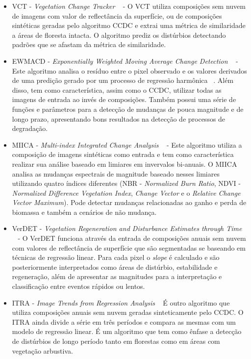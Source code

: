 \documentclass[twocolumn]{article}
\begin{document}
\begin{itemize}
  \item VCT - \textit{Vegetation Change Tracker} ~\cite{Huang2010, THOMAS201119} - O VCT utiliza composições sem nuvem de imagens com valor de reflectância da superfície, ou de composições sintéticas geradas pelo algoritmo CCDC e extrai uma métrica de similaridade a áreas de floresta intacta. O algoritmo prediz os distúrbios detectando padrões que se afastam da métrica de similaridade. 
  
  \item EWMACD - \textit{Exponentially Weighted Moving Average Change Detection} ~\cite{Brooks2014} - Este algoritmo analisa o resíduo entre o pixel observado e os valores derivados de uma predição gerado por um processo de regressão harmônica ~\cite{Brooks2012}. Além disso, tem como característica, assim como o CCDC, utilizar todas as imagens de entrada ao invés de composições. Também possui uma série de funções e parâmetros para a detecção de mudanças de pouca magnitude e de longo prazo, apresentando bons resultados na detecção de processos de degradação.
  
  \item MIICA - \textit{Multi-index Integrated Change Analysis} ~\cite{JIN2013159} - Este algoritmo utiliza a composição de imagens sintéticas como entrada e tem como característica realizar sua análise baseado em limiares em invervalos bi-anuais. O MIICA analisa as mudanças espectrais de magnitude baseado nesses limiares utilizando quatro índices diferentes (NBR - \textit{Normalized Burn Ratio}, NDVI - \textit{Normalized Difference Vegetation Index}, \textit{Change Vector} e o \textit{Relative Change Vector Maximum}). Pode detectar mudanças relacionadas ao ganho e perda de biomassa e também a cenários de não mudança.
  
  \item VerDET - \textit{Vegetation Regeneration and Disturbance Estimates through Time} ~\cite{Hughes2017} - O VerDET funciona através da entrada de composições anuais sem nuvem com valores de reflectância de superfície que são segmentadas se baseando em técnicas de regressão linear. Para cada pixel o \textit{slope} é calculado e são posteriormente interpretados como áreas de distúrbio, estabilidade e regeneração, além de apresentar as magnitudes para a interpretação e classificação entre eventos rápidos ou lentos.
  
  
  \item ITRA - \textit{Image Trends from Regression Analysis} ~\cite{VOGELMANN201292} É outro algoritmo que utiliza composições anuais sem nuvem geradas sinteticamente pelo CCDC. O ITRA ainda divide a série em três períodos e compara as mesmas com um modelo de regressão linear. É um algoritmo que tem como ênfase a detecção de distúrbios de longo período tanto em florestas como em áreas com vegetação arbustiva.
  

\end{itemize}
\end{document}
